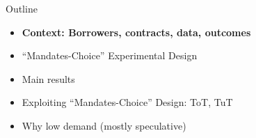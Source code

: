 \documentclass[9pt, aspectratio=169]{beamer}
\begin{document}
\begin{frame}{Outline}
     \large   
     \begin{itemize}
        \item \textbf{Context: Borrowers, contracts, data, outcomes}
         \item \vfill ``Mandates-Choice'' Experimental Design
         \vfill\item Main results
          \vfill\item Exploiting ``Mandates-Choice'' Design: ToT, TuT
         \vfill\item Why low demand (mostly speculative)
     \end{itemize}
\end{frame}
\end{document}
